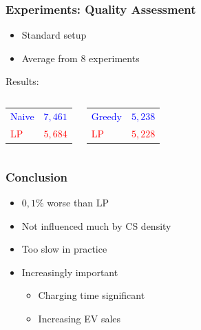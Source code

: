 \begin{frame}
  \frametitle{Experiments: Quality Assessment}
  \begin{itemize}
  	\item Standard setup
  	\item Average from 8 experiments
  \end{itemize}
  \vspace{0.8cm}
  {\large Results:}
  \begin{columns}[c]
    \begin{center}
    	\begin{tabular}{ | l l |}
    	\textcolor{blue}{Naive} & \textcolor{blue}{$7,461$} \\
    	\textcolor{red}{LP} & \textcolor{red}{$5,684$} \\
    	\end{tabular}
  	\end{center}
    \begin{center}
    	\begin{tabular}{ | l l |}
    	\textcolor{blue}{Greedy} & \textcolor{blue}{$5,238$} \\
    	\textcolor{red}{LP} & \textcolor{red}{$5,228$} \\
    	\end{tabular}  
    \end{center}
   \end{columns} 
\end{frame}

\begin{frame}
  \frametitle{Conclusion}
  \begin{itemize}
  \item $0,1 \%$ worse than LP
  \item Not influenced much by CS density
  \item Too slow in practice
  \item Increasingly important
  \begin{itemize}
  \item Charging time significant
  \item Increasing EV sales
  \end{itemize}
  \end{itemize}
\end{frame}
